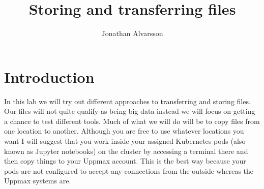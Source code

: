 \documentclass[watermark]{pbpreprint}
\begin{document}
\title{Storing and transferring files}
\newcommand{\subtitle}{Big data i biovetenskap}
\renewcommand{\maketitlehookb}{\centering\textsc{\subtitle}}
\author{Jonathan Alvarsson}
\maketitle
\begin{KeepFromToc}
   \tableofcontents
\end{KeepFromToc}

\lstset{basicstyle=\ttfamily\small, frame = single}

\section{Introduction}
In this lab we will try out different approaches to transferring and storing
files. Our files will not quite qualify as being big data instead we will focus
on getting a chance to test different tools. Much of what we will do will be to
copy files from one location to another. Although you are free to use whatever
locations you want I will suggest that you work inside your assigned Kubernetes
pods (also known as Jupyter notebooks) on the cluster by accessing a terminal
there and then copy things to your Uppmax account. This is the best way because
your pods are not configured to accept any connections from the outside whereas
the Uppmax systems are.
\end{document}
